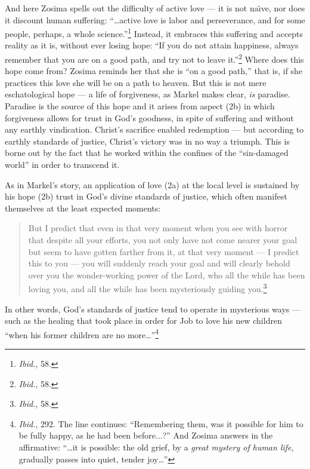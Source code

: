 And here Zosima spells out the difficulty of active love --- it is not na\"{\i}ve, nor does it discount human suffering: ``\ldots active love is labor and perseverance, and for some people, perhaps, a whole science.''\footnote{\emph{Ibid.}, 58.} Instead, it embraces this suffering and accepts reality as it is, without ever losing hope: ``If you do not attain happiness, always remember that you are on a good path, and try not to leave it.''\footnote{\emph{Ibid.}, 58.} Where does this hope come from? Zosima reminds her that she is ``on a good path,'' that is, if she practices this love she will be on a path to heaven. But this is not mere eschatological hope --- a life of forgiveness, as Markel makes clear, \emph{is} paradise. Paradise is the source of this hope and it arises from aspect (2b) in which forgiveness allows for trust in God's goodness, in spite of suffering and without any earthly vindication. Christ's sacrifice enabled redemption --- but according to earthly standards of justice, Christ's victory was in no way a triumph. This is borne out by the fact that he worked within the confines of the ``sin-damaged world'' in order to transcend it. 

As in Markel's story, an application of love (2a) at the local level is sustained by his hope (2b) trust in God's divine standards of justice, which often manifest themselves at the least expected moments:

\begin{quote}
\singlespacing
But I predict that even in that very moment when you see with horror that despite all your efforts, you not only have not come nearer your goal but seem to have gotten farther from it, at that very moment --- I predict this to you --- you will suddenly reach your goal and will clearly behold over you the wonder-working power of the Lord, who all the while has been loving you, and all the while has been mysteriously guiding you.\footnote{\emph{Ibid.}, 58.} 
\end{quote}

In other words, God's standards of justice tend to operate in mysterious ways --- such as the healing that took place in order for Job to love his new children ``when his former children are no more\ldots''\footnote{\emph{Ibid.}, 292. The line continues: ``Remembering them, was it possible for him to be fully happy, as he had been before...?'' And Zosima answers in the affirmative: ``\ldots it is possible: the old grief, by a \emph{great mystery of human life}, gradually passes into quiet, tender joy\ldots''}

